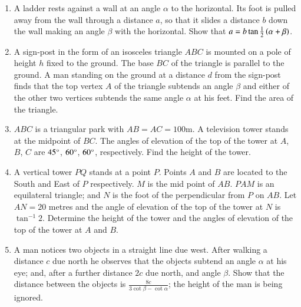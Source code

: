 \begin{enumerate}[label=\thesubsection.\arabic*,ref=\thesubsection.\theenumi]
\hfill{}

\item A ladder rests against a wall at an angle $\alpha$ to the horizontal. Its foot is pulled away from the wall through a distance $a$, so that it slides a distance $b$ down the wall making an angle $\beta$ with the horizontal. Show that $a=b\tan{\frac{1}{2}\ensuremath{\left(\alpha+\beta\right)}}$.

\hfill{}
\item A sign-post in the form of an isosceles triangle $ABC$ is mounted on a pole of height $h$ fixed to the ground. The base $BC$ of the triangle is parallel to the ground. A man standing on the ground at a distance $d$ from the sign-post finds that the top vertex $A$ of the triangle subtends an angle $\beta$ and either of the other two vertices subtends the same angle $\alpha$ at his feet. Find the area of the triangle. 

\hfill{}

\item $ABC$ is a triangular park with $AB=AC=100$m. A television tower stands at the midpoint of $BC$. The angles of elevation of the top of the tower at $A$, $B$, $C$ are $45\degree$, $60\degree$, $60\degree$, respectively. Find the height of the tower. 

\hfill{}

\item A vertical tower $PQ$ stands at a point $P$. Points $A$ and $B$ are located to the South and East of $P$ respectively. $M$ is the mid point of $AB$. $PAM$ is an equilateral triangle; and $N$ is the foot of the perpendicular from $P$ on $AB$. Let $AN=20$ metres and the angle of elevation of the top of the tower at $N$ is $\tan^{-1}{2}$. Determine the height of the tower and the angles of elevation of the top of the tower at $A$ and $B$.

\hfill{}

\item A man notices two objects in a straight line due west. After walking a distance $c$ due north he observes that the objects subtend an angle $\alpha$ at his eye; and, after a further distance $2c$ due north, and angle $\beta$. Show that the distance between the objects is $\frac{8c}{3\cot{\beta}-\cot{\alpha}}$; the height of the man is being ignored. 

\hfill{}
\end{enumerate}
